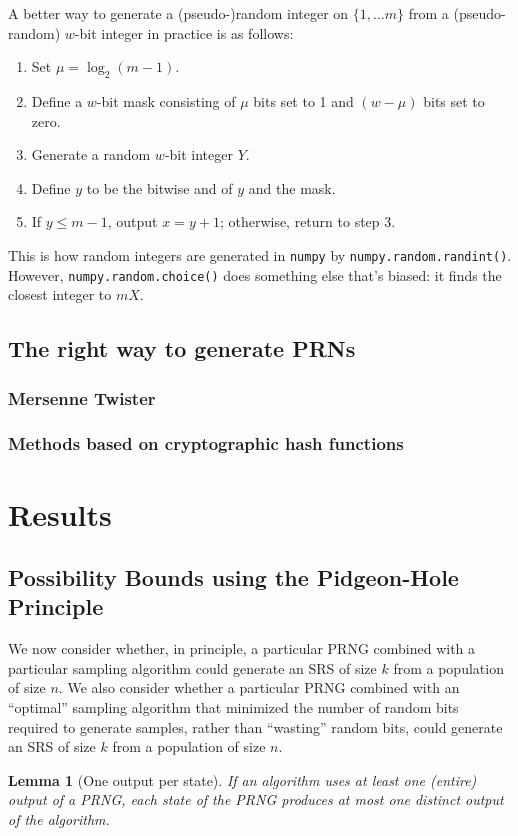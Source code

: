 \documentclass[12pt]{article}
\newtheorem{lemma}[theorem]{Lemma}
\begin{document}
A better way to generate a (pseudo-)random integer on $\{1, \ldots m\}$ from a (pseudo-random) $w$-bit integer in practice is as follows:
\begin{enumerate}
\item Set $\mu = \log_2(m-1)$.
\item Define a $w$-bit mask consisting of $\mu$ bits set to 1 and $(w-\mu)$ bits set to zero.
\item Generate a random $w$-bit integer $Y$.
\item Define $y$ to be the bitwise and of $y$ and the mask.
\item If $y \le m-1$, output $x = y+1$; otherwise, return to step 3.
\end{enumerate}
This is how random integers are generated in \texttt{numpy} by \texttt{numpy.random.randint()}. 
However, \texttt{numpy.random.choice()} does something else that's biased: it finds the closest integer to $mX$.

\subsection{The right way to generate PRNs}
\subsubsection{Mersenne Twister}
\subsubsection{Methods based on cryptographic hash functions}

\section{Results}
\subsection{Possibility Bounds using the Pidgeon-Hole Principle}
We now consider whether, in principle, a particular PRNG combined with a particular sampling algorithm could generate an SRS of size $k$ from a population of size $n$.
We also consider whether a particular PRNG combined with an ``optimal'' sampling algorithm that minimized the number of random bits required to generate samples, rather than ``wasting'' random bits, could generate an SRS of size $k$ from a population of size $n$.


\begin{lemma}[One output per state]
If an algorithm uses at least one (entire) output of a PRNG, each state of the PRNG produces at most one distinct output of the algorithm.
\end{lemma}
\end{document}
